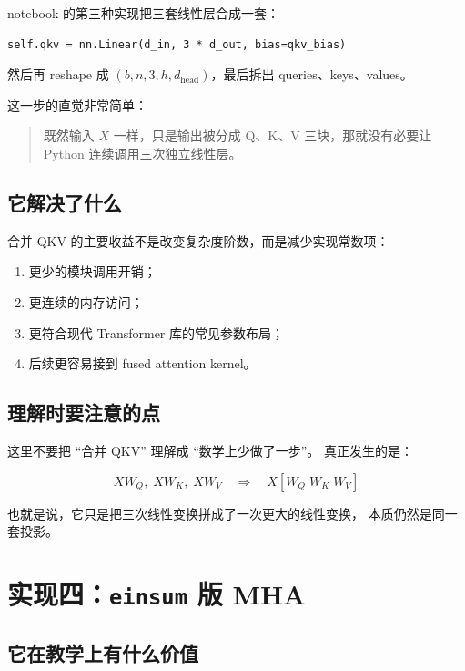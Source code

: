 \documentclass[12pt,a4paper]{ctexart}
\newcommand{\code}[1]{\texttt{#1}}
\begin{document}
notebook 的第三种实现把三套线性层合成一套：

\begin{lstlisting}[style=py]
self.qkv = nn.Linear(d_in, 3 * d_out, bias=qkv_bias)
\end{lstlisting}

然后再 reshape 成
\((b, n, 3, h, d_{\text{head}})\)，最后拆出 queries、keys、values。

这一步的直觉非常简单：

\begin{quote}
既然输入 \(X\) 一样，只是输出被分成 Q、K、V 三块，那就没有必要让 Python 连续调用三次独立线性层。
\end{quote}

\subsection{它解决了什么}

合并 QKV 的主要收益不是改变复杂度阶数，而是减少实现常数项：

\begin{enumerate}
  \item 更少的模块调用开销；
  \item 更连续的内存访问；
  \item 更符合现代 Transformer 库的常见参数布局；
  \item 后续更容易接到 fused attention kernel。
\end{enumerate}

\subsection{理解时要注意的点}

这里不要把 ``合并 QKV'' 理解成 ``数学上少做了一步''。
真正发生的是：

\[
XW_Q,\; XW_K,\; XW_V
\quad\Longrightarrow\quad
X[W_Q\; W_K\; W_V]
\]

也就是说，它只是把三次线性变换拼成了一次更大的线性变换，
本质仍然是同一套投影。

\section{实现四：\texorpdfstring{\code{einsum}}{einsum} 版 MHA}

\subsection{它在教学上有什么价值}
\end{document}
